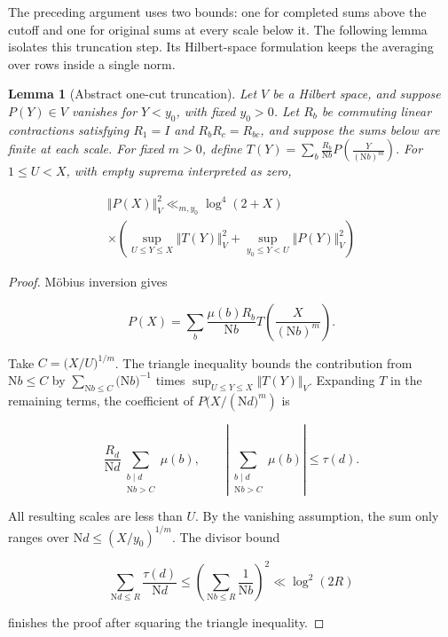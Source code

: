 \documentclass[reqno,a4paper,11pt]{amsart}
\newtheorem{lemma}{Lemma}[section]
\begin{document}
The preceding argument uses two bounds: one for completed sums above the cutoff and one for original sums at every scale below it. The following lemma isolates this truncation step. Its Hilbert-space formulation keeps the averaging over rows inside a single norm.

\begin{lemma}[Abstract one-cut truncation]

Let $V$ be a Hilbert space, and suppose $P\left( Y\right) \in V$ vanishes for $Y<{y}_{0}$, with fixed ${y}_{0}>0$. Let ${R}_{b}$ be commuting linear contractions satisfying ${R}_{1}=I$ and ${R}_{b}{R}_{c}={R}_{bc}$, and suppose the sums below are finite at each scale. For fixed $m>0$, define $T\left( Y\right) =\sum _{b} \frac{{R}_{b}}{\mathrm{N}b}P\left( \frac{Y}{{\left( \mathrm{N}b\right) }^{m}}\right) .$ For $1\le U<X$, with empty suprema interpreted as zero,

\begin{equation}\label{eq:18}
\begin{gathered} \Vert P(X){\Vert }_{V}^{2}{\ll }_{m,{y}_{0}}{\log }^{4}(2+X) \\ \times ({\sup }_{U\le Y\le X}\Vert T(Y){\Vert }_{V}^{2}+{\sup }_{{y}_{0}\le Y<U}\Vert P(Y){\Vert }_{V}^{2}) \end{gathered}
\end{equation}

\end{lemma}

\begin{proof}

Möbius inversion gives

\[
P\left( X\right) =\sum _{b} \frac{\mu \left( b\right) {R}_{b}}{\mathrm{N}b}T\left( \frac{X}{{\left( \mathrm{N}b\right) }^{m}}\right) .
\]

Take $C=(X/U{)}^{1/m}$. The triangle inequality bounds the contribution from $\mathrm{N}b\le C$ by $\sum _{\mathrm{N}b\le C} (\mathrm{N}b{)}^{-1}$ times ${\sup }_{U\le Y\le X}\Vert T(Y){\Vert }_{V}$. Expanding $T$ in the remaining terms, the coefficient of $P(X/(\mathrm{N}d{)}^{m})$ is

\[
\frac{{R}_{d}}{\mathrm{N}d}\sum _{\begin{gathered} b\mid d \\ \mathrm{N}b>C \end{gathered}} \mu \left( b\right) ,\quad \quad \left| \sum _{\begin{gathered} b\mid d \\ \mathrm{N}b>C \end{gathered}} \mu \left( b\right) \right| \le \tau \left( d\right) .
\]

All resulting scales are less than $U$. By the vanishing assumption, the sum only ranges over $\mathrm{N}d\le {\left( X/{y}_{0}\right) }^{1/m}$. The divisor bound

\[
\sum _{\mathrm{N}d\le R} \frac{\tau \left( d\right) }{\mathrm{N}d}\le {\left( \sum _{\mathrm{N}b\le R} \frac{1}{\mathrm{N}b}\right) }^{2}\ll {\log }^{2}\left( 2R\right) 
\]

finishes the proof after squaring the triangle inequality.

\end{proof}
\end{document}
